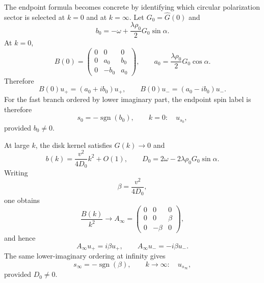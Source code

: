 \documentclass[11pt]{article}
\numberwithin{equation}{section}
\begin{document}
The endpoint formula becomes concrete by identifying which circular
polarization sector is selected at $k=0$ and at $k=\infty$. Let
$G_0=\widehat G(0)$ and
\begin{equation}
  b_0=
  -\omega+\frac{\lambda\rho_0}{2}G_0\sin\alpha .
  \label{eq:b0_endpoint}
\end{equation}
At $k=0$,
\begin{equation}
  B(0)=
  \begin{pmatrix}
  0&0&0\\
  0&a_0&b_0\\
  0&-b_0&a_0
  \end{pmatrix},
  \qquad
  a_0=\frac{\lambda\rho_0}{2}G_0\cos\alpha .
\end{equation}
Therefore
\begin{equation}
  B(0)u_+=(a_0+ib_0)u_+,\qquad
  B(0)u_-=(a_0-ib_0)u_- .
\end{equation}
For the fast branch ordered by lower imaginary part, the endpoint spin
label is therefore
\begin{equation}
  s_0=-\operatorname{sgn}(b_0),
  \qquad
  k=0:\quad u_{s_0},
  \label{eq:zero_endpoint_sector}
\end{equation}
provided $b_0\ne0$.

At large $k$, the disk kernel satisfies $\widehat G(k)\to0$ and
\begin{equation}
  b(k)=\frac{v^2}{4D_0}k^2+O(1),
  \qquad
  D_0=2\omega-2\lambda\rho_0G_0\sin\alpha .
\end{equation}
Writing
\begin{equation}
  \beta=\frac{v^2}{4D_0},
\end{equation}
one obtains
\begin{equation}
  \frac{B(k)}{k^2}\longrightarrow
  A_\infty=
  \begin{pmatrix}
  0&0&0\\
  0&0&\beta\\
  0&-\beta&0
  \end{pmatrix},
\end{equation}
and hence
\begin{equation}
  A_\infty u_+=i\beta u_+,\qquad
  A_\infty u_-=-i\beta u_- .
\end{equation}
The same lower-imaginary ordering at infinity gives
\begin{equation}
  s_\infty=-\operatorname{sgn}(\beta),
  \qquad
  k\to\infty:\quad u_{s_\infty},
  \label{eq:infinity_endpoint_sector}
\end{equation}
provided $D_0\ne0$.
\end{document}

